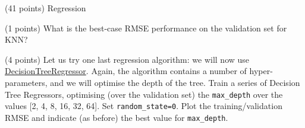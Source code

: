 \documentclass[12pt]{article}
\begin{document}
\begin{question}{\label{Q_LR_BA}(41 points) Regression}
\begin{subquestion}{(1 points) What is the best-case RMSE performance on the validation set for KNN?}






\end{subquestion}

\begin{subquestion}{(4 points) Let us try one last regression algorithm: we will now use \href{https://scikit-learn.org/stable/modules/generated/sklearn.tree.DecisionTreeRegressor.html}{DecisionTreeRegressor}. Again, the algorithm contains a number of hyper-parameters, and we will optimise the depth of the tree. Train a series of Decision Tree Regressors, optimising (over the validation set) the \texttt{max\_depth} over the values [2, 4, 8, 16, 32, 64]. Set \texttt{random\_state=0}. Plot the training/validation RMSE and indicate (as before) the best value for \texttt{max\_depth}.}






\end{subquestion}


\end{question}
\end{document}
